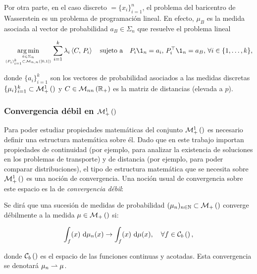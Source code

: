 Por otra parte, en el caso discreto $\xspace=\{x_i\}_{i=1}^n$, el problema del baricentro de Wasserstein es un problema de programación lineal. En efecto, $\mu_B$ es la medida asociada al vector de probabilidad $a_B\in\Sigma_n$ que resuelve el problema lineal

\begin{equation}
	\label{eq:discrete_barycenter}
	\argmin_{\feasible{\bar a\in\Sigma_n}{(P_i)_{i=1}^k\subset \matrixspace{n,n}{[0,1]}}}
	\sum_{i=1}^k \lambda_i\dotproduct{C}{P_i}
	\quad\text{sujeto a}\quad
	P_i\1_n = a_i,\, P_i^\top \1_n = a_B,\,\forall i\in\{1,\ldots,k\} ,
\end{equation}

donde $\{a_i\}_{i=1}^k$ son los vectores de probabilidad asociados a las medidas discretas $\{\mu_i\}_{i=1}^k\subset\mathcal{M}_+^1\left(\right)$ y $C\in\mathcal{M}_{nn}\left(\mathbb{R}_+\right)$ es la matriz de distancias (elevada a $p$).

\subsubsection{Convergencia débil en \texorpdfstring{$\mathcal{M}_+^1\left(\right)$}{el espacio de medidas de probabilidad}}

Para poder estudiar propiedades matemáticas del conjunto $\mathcal{M}_+^1\left(\right)$ es necesario definir una estructura matemática sobre él. Dado que en este trabajo importan propiedades de continuidad (por ejemplo, para analizar la existencia de soluciones en los problemas de transporte) y de distancia (por ejemplo, para poder comparar distribuciones), el tipo de estructura matemática que se necesita sobre $\mathcal{M}_+^1\left(\right)$ es una noción de convergencia. Una noción usual de convergencia sobre este espacio es la de \textit{convergencia débil}:

\begin{defn}
	\label{defn:measure_weak_convergence}
	Se dirá que una sucesión de medidas de probabilidad $(\mu_n)_{n\in\mathbb{N}}\subset\mathcal{M}_+\left(\right)$ converge débilmente a la medida $\mu\in\mathcal{M}_+\left(\right)$ si:

	\begin{equation*}
		\label{eq:measure_weak_convergence}
		\int_ f(x) \,\operatorname{d}\!\mu_n(x) \to \int_ f(x) \,\operatorname{d}\!\mu(x),
		\quad\forall f\in\mathcal{C}_b\left(\right) ,
	\end{equation*}

	donde $\mathcal{C}_b\left(\right)$ es el espacio de las funciones continuas y acotadas. Esta convergencia se denotará $\mu_n\rightharpoonup\mu$.
\end{defn}

